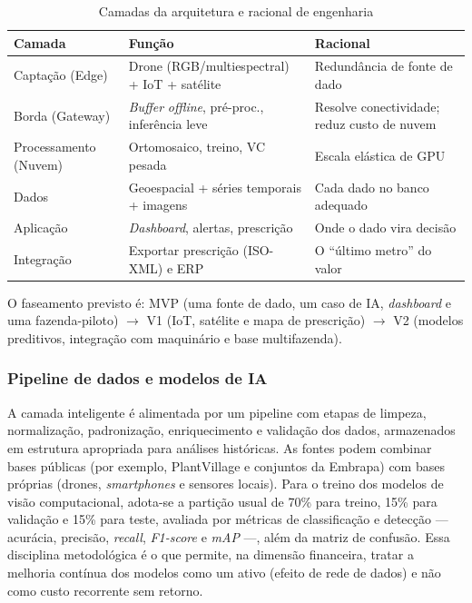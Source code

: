\documentclass[conference]{IEEEtran}
\begin{document}
\begin{table}[!t]
\caption{Camadas da arquitetura e racional de engenharia}
\label{tab:arq}
\centering
\footnotesize
\begin{tabular}{@{}p{1.5cm}p{2.3cm}p{3.0cm}@{}}
\toprule
\textbf{Camada} & \textbf{Função} & \textbf{Racional} \\
\midrule
Captação (Edge) & Drone (RGB/multiespectral) + IoT + satélite & Redundância de fonte de dado \\
Borda (Gateway) & \textit{Buffer} \textit{offline}, pré-proc., inferência leve & Resolve conectividade; reduz custo de nuvem \\
Processamento (Nuvem) & Ortomosaico, treino, VC pesada & Escala elástica de GPU \\
Dados & Geoespacial + séries temporais + imagens & Cada dado no banco adequado \\
Aplicação & \textit{Dashboard}, alertas, prescrição & Onde o dado vira decisão \\
Integração & Exportar prescrição (ISO-XML) e ERP & O ``último metro'' do valor \\
\bottomrule
\end{tabular}
\end{table}

O faseamento previsto é: MVP (uma fonte de dado, um caso de IA, \textit{dashboard} e uma fazenda-piloto) $\rightarrow$ V1 (IoT, satélite e mapa de prescrição) $\rightarrow$ V2 (modelos preditivos, integração com maquinário e base multifazenda).

\subsubsection*{Pipeline de dados e modelos de IA}
A camada inteligente é alimentada por um pipeline com etapas de limpeza, normalização, padronização, enriquecimento e validação dos dados, armazenados em estrutura apropriada para análises históricas. As fontes podem combinar bases públicas (por exemplo, PlantVillage e conjuntos da Embrapa) com bases próprias (drones, \textit{smartphones} e sensores locais). Para o treino dos modelos de visão computacional, adota-se a partição usual de 70\% para treino, 15\% para validação e 15\% para teste, avaliada por métricas de classificação e detecção --- acurácia, precisão, \textit{recall}, \textit{F1-score} e \textit{mAP} ---, além da matriz de confusão. Essa disciplina metodológica é o que permite, na dimensão financeira, tratar a melhoria contínua dos modelos como um ativo (efeito de rede de dados) e não como custo recorrente sem retorno.
\end{document}
